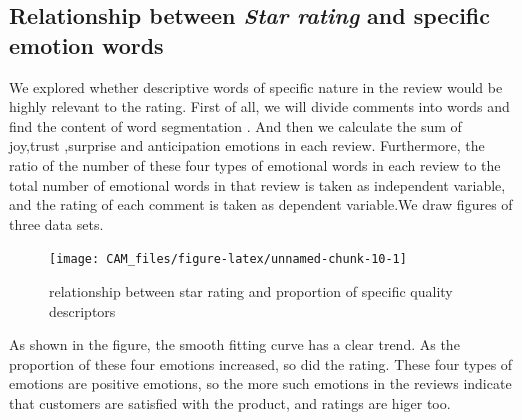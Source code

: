 \documentclass[12pt,a4paper,]{article}
\begin{document}
\hypertarget{relationship-between-star-rating-and-specific-emotion-words}{%
\subsection{\texorpdfstring{Relationship between \emph{Star rating} and
specific emotion
words}{Relationship between Star rating and specific emotion words}}\label{relationship-between-star-rating-and-specific-emotion-words}}

We explored whether descriptive words of specific nature in the review
would be highly relevant to the rating. First of all, we will divide
comments into words and find the content of word segmentation . And then
we calculate the sum of joy,trust ,surprise and anticipation emotions in
each review. Furthermore, the ratio of the number of these four types of
emotional words in each review to the total number of emotional words in
that review is taken as independent variable, and the rating of each
comment is taken as dependent variable.We draw figures of three data
sets.

\begin{figure}

{\centering \texttt{[image: CAM\_files/figure-latex/unnamed-chunk-10-1]} 

}

\caption{relationship between star rating and proportion of specific quality descriptors}\label{fig:unnamed-chunk-10}
\end{figure}

As shown in the figure, the smooth fitting curve has a clear trend. As
the proportion of these four emotions increased, so did the rating.
These four types of emotions are positive emotions, so the more such
emotions in the reviews indicate that customers are satisfied with the
product, and ratings are higer too.
\end{document}
